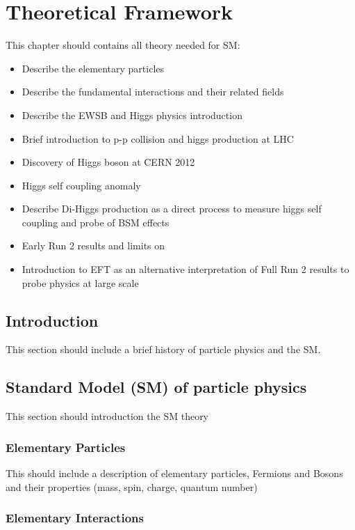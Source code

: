 \newpage
\chapter{Theoretical Framework}
\label{chap1}

This chapter should contains all theory needed for SM:
\begin{itemize}
    \item Describe the elementary particles 
    \item Describe the fundamental interactions and their related fields
    \item Describe the EWSB and Higgs physics introduction
    \item Brief introduction to p-p collision and higgs production at LHC
    \item Discovery of Higgs boson at CERN 2012
    \item Higgs self coupling anomaly
    \item Describe Di-Higgs production as a direct process to measure higgs self coupling and probe of BSM effects
    \item Early Run 2 results and limits on \kl
    \item Introduction to EFT as an alternative interpretation of Full Run 2 results to probe physics at large scale 
\end{itemize}

\section{Introduction}
\label{chap1:intro}

This section should include a brief history of particle physics and the SM. 

\section{Standard Model (SM) of particle physics}
\label{chap1:SM}

This section should introduction the SM theory

\subsection{Elementary Particles}
\label{chap1:SM:EP}

This should include a description of elementary particles, Fermions and  Bosons and their properties (mass, spin, charge, quantum number)

\subsection{Elementary Interactions}
\label{chap1:SM:EI}

